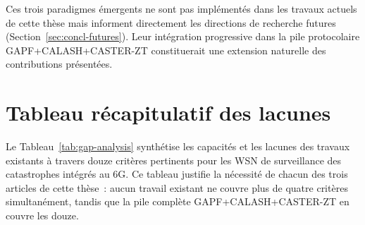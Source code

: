 Ces trois paradigmes émergents ne sont pas implémentés dans les travaux actuels de cette thèse mais informent directement les directions de recherche futures (Section~\ref{sec:concl-futures}). Leur intégration progressive dans la pile protocolaire GAPF+CALASH+CASTER-ZT constituerait une extension naturelle des contributions présentées.


\section{Tableau récapitulatif des lacunes}\label{sec:revlit-gap-table}

Le Tableau~\ref{tab:gap-analysis} synthétise les capacités et les lacunes des travaux existants à travers douze critères pertinents pour les WSN de surveillance des catastrophes intégrés au 6G. Ce tableau justifie la nécessité de chacun des trois articles de cette thèse~: aucun travail existant ne couvre plus de quatre critères simultanément, tandis que la pile complète GAPF+CALASH+CASTER-ZT en couvre les douze.

